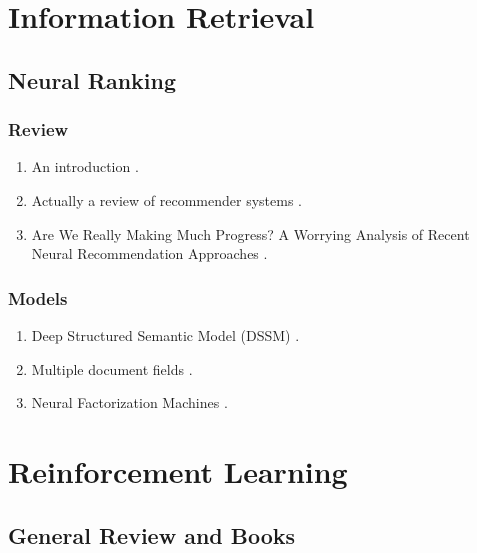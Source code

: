 \documentclass{article}
\begin{document}
\section{Information Retrieval}

\subsection{Neural Ranking}

\subsubsection{Review}

\begin{enumerate}

\item An introduction \cite{mitra2018an}.

\item Actually a review of recommender systems \cite{Zhang2019}.

\item Are We Really Making Much Progress? A Worrying Analysis of Recent Neural Recommendation Approaches \cite{Dacrema2019}.

\end{enumerate}


\subsubsection{Models}

\begin{enumerate}

\item Deep Structured Semantic Model (DSSM) \cite{huang2013learning}.

\item Multiple document fields \cite{Zamani2018}.

\item Neural Factorization Machines \cite{He2017}.

\end{enumerate}




\section{Reinforcement Learning}

\subsection{General Review and Books}
\end{document}
